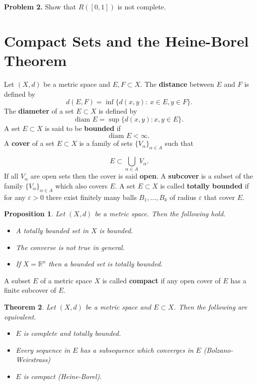 \documentclass[12pt]{report}
\newtheorem{theorem}{Theorem}[section]
\newtheorem{prop}[theorem]{Proposition}
\begin{document}
\medskip
\noindent
\textbf{Problem 2.}  Show that $R([0,1])$ is not complete.


\section{Compact Sets and the Heine-Borel
Theorem }
Let $(X, d)$ be a metric space and $E, F \subset X$.  The
\textbf{distance} between $E$ and $F$ is defined  by
\[ d(E, F) = \inf \{d(x, y): \ x \in E, y \in F\}.
\] The \textbf{diameter} of a set $E \subset X$ is defined by
\[
\mbox{diam } E = \sup \{d(x, y): x, y \in E\}.
\] A set $E \subset X$ is said to be \textbf{bounded} if
\[
\mbox{diam } E < \infty.
\] A \textbf{cover} of a set $E \subset X$ is a family of sets
$\{V_\alpha\}_{\alpha
\in A}$ such that

\[ E \subset \bigcup_{\alpha \in A} V_\alpha.
\]
If all $V_\alpha$ are open sets then the cover is said \textbf{open}. 
A \textbf{subcover} is a subset of the family $\{V_\alpha\}_{\alpha
\in A}$ which also covers $E$.
A set $E \subset X$ is called \textbf{totally bounded} if for any
$\varepsilon > 0$ there exist finitely many balls $B_1, \dots, B_k$ of
radius $\varepsilon$ that cover $E$.



\begin{prop}  
\label{pr:totally-bdd}
 Let $(X, d)$ be a metric space.  Then
the following hold.

\begin{itemize}
\item[1.]  \textit{A totally bounded set in $X$ is bounded.}
\item[2.]  \textit{The converse is not true in general.}
\item[3.] \textit{ If $X = \mathbb{R}^n$ then a bounded set is totally
bounded.}
\end{itemize}
\end{prop}
A subset $E$ of a metric space $X$ is called \textbf{compact} if any
open cover of $E$ has a finite subcover of $E$.

\begin{theorem}
\label{th:Heine-Borel}
  Let $(X, d)$ be a metric space and $E
\subset X$.  Then the following are equivalent.
\begin{itemize}
\item[(a)]  $E$ is complete and totally bounded.
\item[(b)]  Every sequence in $E$ has a subsequence which
converges in $E$ (Bolzano-Weirstrass)
\item[(c)]  $E$ is compact (Heine-Borel).
\end{itemize}
\end{theorem}
\end{document}
